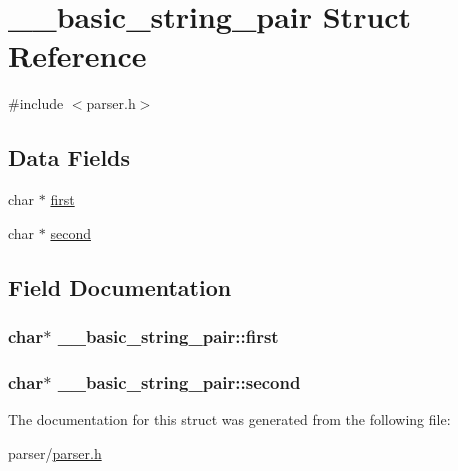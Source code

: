 \hypertarget{struct____basic__string__pair}{}\section{\+\_\+\+\_\+basic\+\_\+string\+\_\+pair Struct Reference}
\label{struct____basic__string__pair}


{\ttfamily \#include $<$parser.\+h$>$}

\subsection*{Data Fields}
\begin{DoxyCompactItemize}
\item 
char $\ast$ \hyperlink{struct____basic__string__pair_a9f7784cb2976bcb2e46b0b2b497ee085}{first}
\item 
char $\ast$ \hyperlink{struct____basic__string__pair_afda7669ed771f9f76cd52c19d299c1ad}{second}
\end{DoxyCompactItemize}


\subsection{Field Documentation}
\subsubsection[{\texorpdfstring{first}{first}}]{\setlength{\rightskip}{0pt plus 5cm}char$\ast$ \+\_\+\+\_\+basic\+\_\+string\+\_\+pair\+::first}\hypertarget{struct____basic__string__pair_a9f7784cb2976bcb2e46b0b2b497ee085}{}\label{struct____basic__string__pair_a9f7784cb2976bcb2e46b0b2b497ee085}
\subsubsection[{\texorpdfstring{second}{second}}]{\setlength{\rightskip}{0pt plus 5cm}char$\ast$ \+\_\+\+\_\+basic\+\_\+string\+\_\+pair\+::second}\hypertarget{struct____basic__string__pair_afda7669ed771f9f76cd52c19d299c1ad}{}\label{struct____basic__string__pair_afda7669ed771f9f76cd52c19d299c1ad}


The documentation for this struct was generated from the following file\+:\begin{DoxyCompactItemize}
\item 
parser/\hyperlink{parser_8h}{parser.\+h}\end{DoxyCompactItemize}
